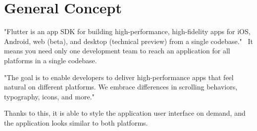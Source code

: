 \section{General Concept}\label{sec:general-concept}
"Flutter is an app SDK for building high-performance, high-fidelity apps for iOS, Android, web (beta), and desktop (technical preview) from a single codebase."~\cite{flutterTechnicalOverview}
It means you need only one development team to reach an application for all platforms in a single codebase.

"The goal is to enable developers to deliver high-performance apps that feel natural on different platforms.
We embrace differences in scrolling behaviors, typography, icons, and more."~\cite{flutterTechnicalOverview}

Thanks to this, it is able to style the application user interface on demand, and the application looks similar to both platforms.
